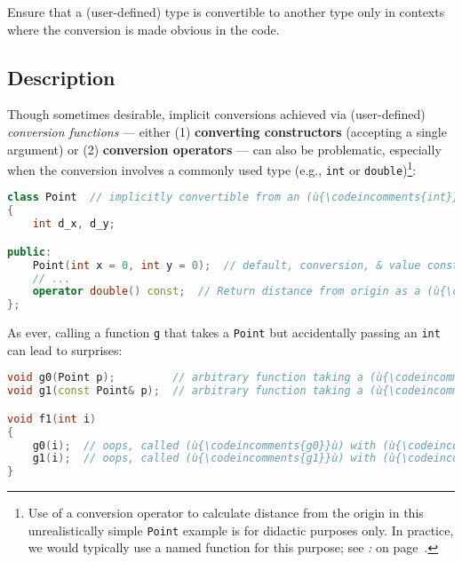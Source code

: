 

Ensure that a (user-defined) type is convertible to another type only in
contexts where the conversion is made obvious in the code.

\subsection[Description]{Description}\label{description-explicitconv}

Though sometimes desirable, implicit conversions achieved via (user-defined) \emph{conversion
functions} --- either (1) \textbf{converting constructors} (accepting a
single argument) or (2) \textbf{conversion operators} --- can also be problematic, especially when the
conversion involves a commonly used type (e.g., \texttt{int} or
\texttt{double}){\cprotect\footnote{Use of a conversion operator to
calculate distance from the origin in this unrealistically simple \texttt{Point}
example is for didactic purposes only. In practice, we would typically
use a named function for this purpose; see {\it{}: } on page~\pageref{sometimes-a-named-function-is-better}.}}:

\begin{lstlisting}[language=C++]
class Point  // implicitly convertible from an (ù{\codeincomments{int}}ù) or to a (ù{\codeincomments{double}}ù)
{
    int d_x, d_y;

public:
    Point(int x = 0, int y = 0);  // default, conversion, & value constructor
    // ...
    operator double() const;  // Return distance from origin as a (ù{\codeincomments{double}}ù).
};
\end{lstlisting}

\noindent As ever, calling a function \texttt{g} that takes a \texttt{Point} but
accidentally passing an \texttt{int} can lead to surprises:

\begin{lstlisting}[language=C++]
void g0(Point p);         // arbitrary function taking a (ù{\codeincomments{Point}}ù) object by value
void g1(const Point& p);  // arbitrary function taking a (ù{\codeincomments{Point}}ù) by (ù{\codeincomments{const}}ù) reference

void f1(int i)
{
    g0(i);  // oops, called (ù{\codeincomments{g0}}ù) with (ù{\codeincomments{Point(i, 0)}}ù) by mistake
    g1(i);  // oops, called (ù{\codeincomments{g1}}ù) with (ù{\codeincomments{Point(i, 0)}}ù) by mistake
}
\end{lstlisting}

